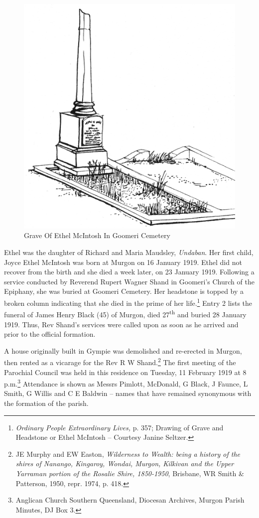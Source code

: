 \begin{figure}
\begin{center}
\includegraphics[width=.7\linewidth,center]{../images/graveOfEthelMcIntoshInGoomeriCemetery.jpg}
\caption{Grave Of Ethel McIntosh In Goomeri Cemetery}
\end{center}
\end{figure}




Ethel was the daughter of Richard and Maria Maudsley, \emph{Undaban}. Her first child, Joyce Ethel McIntosh was born at Murgon on 16 January 1919. Ethel did not recover from the birth and she died a week later, on 23 January 1919. Following a service conducted by Reverend Rupert Wagner Shand in Goomeri's Church of the Epiphany, she was buried at Goomeri Cemetery. Her headstone is topped by a broken column indicating that she died in the prime of her life.\footnote{\emph{Ordinary People Extraordinary Lives,} p. 357; Drawing of Grave and Headstone or Ethel McIntosh -- Courtesy Janine Seltzer.} Entry 2 lists the funeral of James Henry Black (45) of Murgon, died 27\textsuperscript{th} and buried 28 January 1919. Thus, Rev Shand's services were called upon as soon as he arrived and prior to the official formation.


A house originally built in Gympie was demolished and re-erected in Murgon, then rented as a vicarage for the Rev R W Shand.\footnote{JE Murphy and EW Easton, \emph{Wilderness to Wealth: being a history of the shires of Nanango, Kingaroy, Wondai, Murgon, Kilkivan and the Upper Yarraman portion of the Rosalie Shire, 1850-1950}, Brisbane, WR Smith \& Patterson, 1950, repr. 1974, p. 418.} The first meeting of the Parochial Council was held in this residence on Tuesday, 11 February 1919 at 8 p.m.\footnote{Anglican Church Southern Queensland, Diocesan Archives, Murgon Parish Minutes, DJ Box 3.} Attendance is shown as Messrs Pimlott, McDonald, G Black, J Faunce, L Smith, G Willis and C E Baldwin -- names that have remained synonymous with the formation of the parish.



